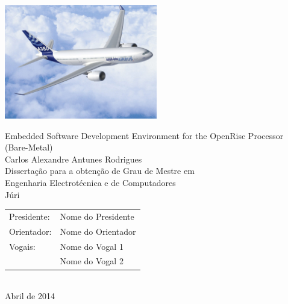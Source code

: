 \begin{center}
%
\vspace{2.5cm}
\includegraphics[height=50mm]{Figures/Airbus_A350.jpg}

\vspace{0.8cm}
{\FontLb Embedded Software Development Environment for the OpenRisc Processor (Bare-Metal)} \\
\vspace{2.6cm}
{\FontMb Carlos Alexandre Antunes Rodrigues} \\
\vspace{1.9cm}
{\FontLn Disserta\c{c}\~{a}o para a obten\c{c}\~{a}o de Grau de Mestre em} \\
\vspace{0.3cm}
{\FontLb Engenharia Electrotécnica e de Computadores} \\
\vspace{1.9cm}
{\FontMb J\'{u}ri} \\
\vspace{0.3cm}
{\FontSn %
\begin{tabular}{ll}
Presidente: & Nome do Presidente \\
Orientador: & Nome do Orientador \\
Vogais: & Nome do Vogal 1 \\
        & Nome do Vogal 2 \\
\end{tabular} } \\
\vspace{1.5cm}
{\FontMb Abril de 2014} \\
%
\end{center}

\cleardoublepage

